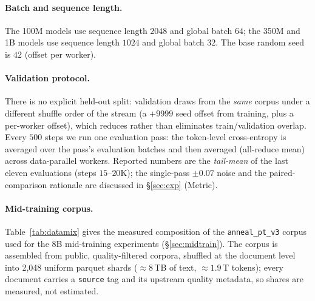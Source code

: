 \documentclass{article}
\begin{document}
\paragraph{Batch and sequence length.} The 100M models use sequence length $2048$ and
global batch $64$; the 350M and 1B models use sequence length $1024$ and global batch
$32$. The base random seed is $42$ (offset per worker).

\paragraph{Validation protocol.} There is no explicit held-out split: validation
draws from the \emph{same} corpus under a different shuffle order of the stream (a
$+9999$ seed offset from training, plus a per-worker offset), which reduces rather
than eliminates train/validation overlap. Every $500$ steps we run one evaluation
pass: the token-level cross-entropy is averaged over the pass's evaluation batches and
then averaged (all-reduce mean) across data-parallel workers. Reported numbers are the
\emph{tail-mean} of the last eleven evaluations (steps $15$--$20$K); the single-pass
$\pm0.07$ noise and the paired-comparison rationale are discussed in \S\ref{sec:exp}
(Metric).

\paragraph{Mid-training corpus.} Table~\ref{tab:datamix} gives the measured
composition of the \texttt{anneal\_pt\_v3} corpus used for the 8B mid-training
experiments (\S\ref{sec:midtrain}). The corpus is assembled from public,
quality-filtered corpora, shuffled at the document level into 2{,}048 uniform
parquet shards ($\approx 8$\,TB of text, $\approx 1.9$\,T tokens); every document
carries a \texttt{source} tag and its upstream quality metadata, so shares are
measured, not estimated.
\end{document}
